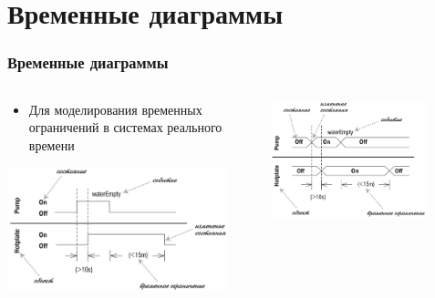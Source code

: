 \documentclass{../../slides-style}
\begin{document}
    \section{Временные диаграммы}

    \begin{frame}
        \frametitle{Временные диаграммы}
        \begin{columns}
            \begin{column}{0.5\textwidth}
                \begin{itemize}
                    \item Для моделирования временных ограничений в системах реального времени
                \end{itemize}
                \vspace{3mm}
                \begin{center}
                    \includegraphics[width=0.9\textwidth]{timingDiagrams.png}
                \end{center}
            \end{column}
            \begin{column}{0.5\textwidth}
                \begin{center}
                    \includegraphics[width=0.8\textwidth]{timingDiagramsAlternate.png}
                \end{center}
            \end{column}
        \end{columns}
    \end{frame}
\end{document}

